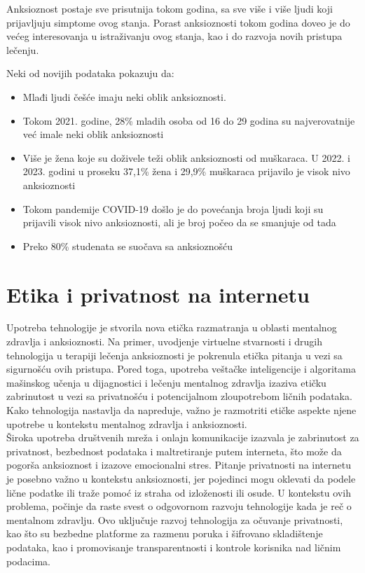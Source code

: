 \documentclass[a4paper]{article}
\begin{document}
    Anksioznost postaje sve prisutnija tokom godina, sa sve više i više ljudi koji prijavljuju simptome ovog stanja. Porast anksioznosti tokom godina doveo je do većeg interesovanja u istraživanju ovog stanja, kao i do razvoja novih pristupa lečenju. 
    
      
              
                
                 Neki od novijih podataka \cite{treca} pokazuju da:
                \begin{itemize}
    		 	\item Mlađi ljudi češće imaju neki oblik anksioznosti.
    		 	\item Tokom 2021. godine, 28\% mladih osoba od 16 do 29 godina su najverovatnije već imale neki oblik anksioznosti
    		 	\item Više je žena koje su doživele teži oblik anksioznosti od muškaraca. U 2022. i 2023. godini u proseku 37,1\% žena i 29,9\% muškaraca prijavilo je visok nivo anksioznosti 
    		 	\item Tokom pandemije COVID-19 došlo je do povećanja broja ljudi koji su prijavili visok nivo anksioznosti, ali je broj počeo da se smanjuje od tada
                    \item Preko 80\% studenata se suočava sa anksioznošću \cite{druga}
                   
    		 
    		 			 	
    		 \end{itemize}  
   		

    \section{Etika i privatnost na internetu}
    \label{sec:podnaslov2}
        Upotreba tehnologije je stvorila nova etička razmatranja u oblasti mentalnog zdravlja i anksioznosti. Na primer, uvodjenje virtuelne stvarnosti i drugih tehnologija u terapiji lečenja anksioznosti je pokrenula etička pitanja u vezi sa sigurnošću ovih pristupa. Pored toga, upotreba veštačke inteligencije i algoritama mašinskog učenja u dijagnostici i lečenju mentalnog zdravlja izaziva etičku zabrinutost u vezi sa privatnošću i potencijalnom zloupotrebom ličnih podataka. Kako tehnologija nastavlja da napreduje, važno je razmotriti etičke aspekte njene upotrebe u kontekstu mentalnog zdravlja i anksioznosti. \\
        
        Široka upotreba društvenih mreža i onlajn komunikacije izazvala je zabrinutost za privatnost, bezbednost podataka i maltretiranje putem interneta, što može da pogorša anksioznost i izazove emocionalni stres. Pitanje privatnosti na internetu je posebno važno u kontekstu anksioznosti, jer pojedinci mogu oklevati da podele lične podatke ili traže pomoć iz straha od izloženosti ili osude. U kontekstu ovih problema, počinje da raste svest o odgovornom razvoju tehnologije kada je reč o mentalnom zdravlju. Ovo uključuje razvoj tehnologija za očuvanje privatnosti, kao što su bezbedne platforme za razmenu poruka i šifrovano skladištenje podataka, kao i promovisanje transparentnosti i kontrole korisnika nad ličnim podacima. \\
        
\end{document}
